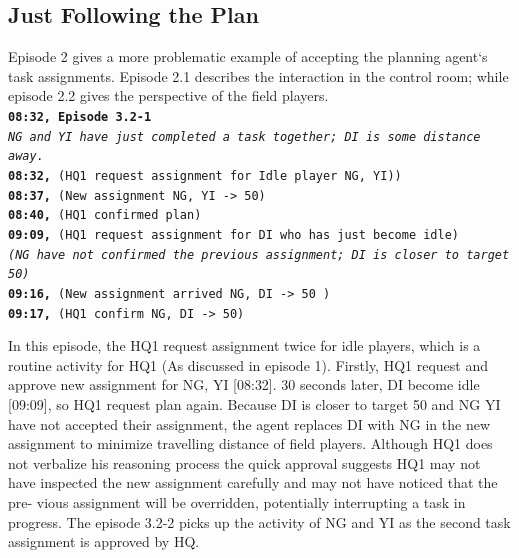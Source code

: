 \subsection{Just Following the Plan}\label{sec:study3planfollow}
Episode 2 gives a more problematic example of accepting the planning agent`s task assignments. Episode 2.1 describes the interaction in the control room; while episode 2.2 gives the perspective of the field players.\\

\noindent\texttt{\textbf{08:32, Episode 3.2-1}\\
\emph{NG and YI have just completed a task together; DI is some distance away.}\\
\textbf{08:32,} (HQ1 request assignment for Idle player NG, YI))\\
\textbf{08:37,} (New assignment NG, YI -> 50) \\
\textbf{08:40,} (HQ1 confirmed plan) \\
\textbf{09:09,} (HQ1 request assignment for DI who has just become idle) \\
\emph{(NG have not confirmed the previous assignment; DI is closer to target 50)}\\
\textbf{09:16,} (New assignment arrived NG, DI -> 50 )\\
\textbf{09:17,} (HQ1 confirm NG, DI -> 50)\\
}



In this episode, the HQ1 request assignment twice for idle players, which is a routine activity for HQ1 (As discussed in episode 1). Firstly, HQ1 request and approve new assignment for NG, YI [08:32]. 30 seconds later, DI become idle [09:09], so HQ1 request plan again. Because DI is closer to target 50 and NG YI have not accepted their assignment, the agent replaces DI with NG in the new assignment to minimize travelling distance of field players. Although HQ1 does not verbalize his reasoning process the quick approval suggests HQ1 may not have inspected the new assignment carefully and may not have noticed that the pre- vious assignment will be overridden, potentially interrupting a task in progress. The episode 3.2-2 picks up the activity of NG and YI as the second task assignment is approved by HQ.\\

